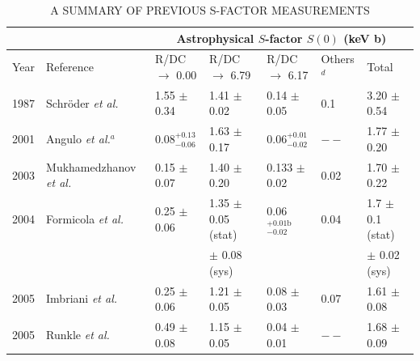 \begin{table}
\caption{A SUMMARY OF PREVIOUS S-FACTOR MEASUREMENTS}
\hspace*{-1.5cm}

\begin{threeparttable}
\begin{tabular}{@{}lllllll@{}}
\toprule
     &                                                          & \multicolumn{5}{c}{Astrophysical $S$-factor $S(0)$ (keV b)}                                                                                                                               \\ \midrule
Year & Reference                                                & R/DC $\rightarrow$ 0.00                         & R/DC $\rightarrow$ 6.79                 & R/DC $\rightarrow$ 6.17        & Others$^{d}$ & Total                                         \\
\hline
1987 & Schr{\"o}der \textit{et al.} \cite{Schroder1987}          & 1.55 $\pm$ 0.34                                 & 1.41 $\pm$ 0.02                         & 0.14 $\pm$ 0.05                & 0.1          & 3.20 $\pm$ 0.54                               \\
2001 & Angulo \textit{et al.}$^{a}$ \cite{Angulo2001}            & 0.08$^{+0.13}_{-0.06}$                          & 1.63 $\pm$ 0.17                         & 0.06$^{+0.01}_{-0.02}$          & $--$         & 1.77 $\pm$ 0.20                               \\
2003 & Mukhamedzhanov \textit{et al.} \cite{Mukhamedzhanov2003} & 0.15 $\pm$ 0.07                                 & 1.40 $\pm$ 0.20                         & 0.133 $\pm$ 0.02               & 0.02         & 1.70 $\pm$ 0.22                               \\
2004 & Formicola \textit{et al.} \cite{Formicola2004}            & 0.25 $\pm$ 0.06                                 & 1.35 $\pm$ 0.05 (stat) & 0.06$^{+0.01 \text{b}}_{-0.02}$ & 0.04         & 1.7 $\pm$ 0.1 (stat)        \\
 & & & $\pm$ 0.08 (sys) & & & $\pm$ 0.02 (sys) \\
2005 & Imbriani \textit{et al.} \cite{Imbriani2005}              & 0.25 $\pm$ 0.06                                 & 1.21 $\pm$ 0.05                         & 0.08 $\pm$ 0.03                & 0.07         & 1.61 $\pm$ 0.08                               \\
2005 & Runkle \textit{et al.} \cite{Runkle2005}                  & 0.49 $\pm$ 0.08                                 & 1.15 $\pm$ 0.05                         & 0.04 $\pm$ 0.01                & $--$         & 1.68 $\pm$ 0.09                               \\

\end{tabular}
\end{threeparttable}
\end{table}
